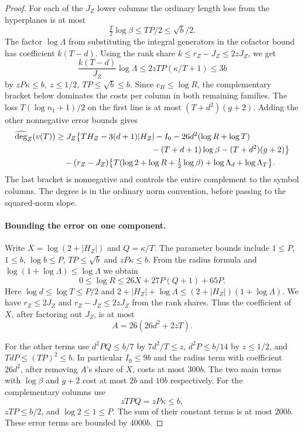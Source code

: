 \begin{proof}
For each of the \(J_Z\) lower columns the ordinary length loss from
the hyperplanes is at most
\[
             \tfrac T2\log\beta\le TP/2\le\sqrt b/2.
\]
The factor \(\log\Lambda\) from substituting the integral generators
in the cofactor bound has coefficient \(k(T-d)\). Using the rank
share \(k\le r_Z-J_Z\le2zJ_Z\), we get
\[
 \frac{k(T-d)}{J_Z}\log\Lambda
 \le 2zTP(\kappa/T+1)\le 3b
\]
by \(zP\kappa\le b,\ z\le1/2,\ TP\le\sqrt b\le b\).
Since \(c_H\le\log R\), the complementary bracket below
dominates the costs per column in both remaining families.
The loss \(T(\log n_1+1)/2\) on the first line is at most
\((T+d^2)(g+2)\). Adding the other nonnegative error bounds gives
\begin{align}
 \widehat{\deg}_Z(v(T))
 &\ge J_Z\big\{T H_Z-3(d+1)|H_Z|-I_0
       -26d^2(\log R+\log T)\notag\\
 &\hspace{41mm}{}-(T+d+1)\log\beta
       -(T+d^2)(g+2)\big\}\notag\\
 &\quad -(r_Z-J_Z)
       \big\{T(\log 2+\log R+\tfrac12\log\beta)
                        +\log\Lambda_d+\log\Lambda_T\big\}.
 \label{eq:deep-hs-raw}
\end{align}
The last bracket is
nonnegative and controls the entire complement to the
symbol columns. The degree is in the ordinary norm
convention, before passing to the squared-norm slope.
\label{cor:covolume-hilbert-samuel-4}

\paragraph{Bounding the error on one component.}
Write \(X=\log(2+|H_Z|)\) and \(Q=\kappa/T\).
The parameter bounds include \(1\le P\), \(1\le b\),
\(\log b\le P\), \(TP\le\sqrt b\) and
\(zP\kappa\le b\). From the radius formula and
\(\log(1+\log\Lambda)\le\log\Lambda\) we obtain
\[
 0\le\log R\le 26X+27P(Q+1)+65P .
\]
Here \(\log d\le\log T\le P/2\) and
\(2+|H_Z|+\log\Lambda\le(2+|H_Z|)(1+\log\Lambda)\).
We have \(r_Z\le2J_Z\) and
\(r_Z-J_Z\le 2zJ_Z\) from the rank shares.
Thus the coefficient of \(X\), after factoring out
\(J_Z\), is at most
\[
 A=26(26d^2+2zT).
\]

For the other terms use
\(d^2P Q\le b/7\) by \(7d^2/T\le z\),
\(d^2P\le b/14\) by \(z\le1/2\), and
\(TdP\le(TP)^2\le b\).
In particular \(I_0\le9b\) and the radius term
with coefficient \(26d^2\), after removing \(A\)'s
share of \(X\), costs at most \(300b\).
The two main terms with \(\log\beta\) and \(g+2\)
cost at most \(2b\) and \(10b\) respectively.
For the complementary columns use
\[
 zTPQ=zP\kappa \le b,
\]
\(zTP\le b/2\), and \(\log2\le1\le P\).
The sum of their constant terms is at most \(200b\).
These error terms are bounded by \(4000b\).


\end{proof}
